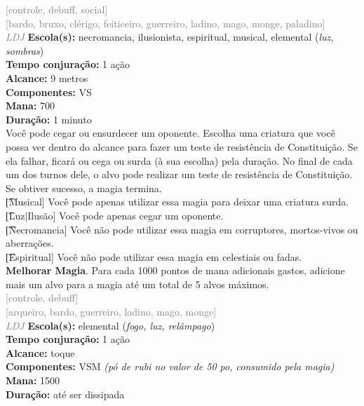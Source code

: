 \documentclass{RPG_Adventure}[2021/10/20]
\begin{document}
{\scriptsize \textcolor{gray}{[controle, debuff, social]\\}}
{\scriptsize \textcolor{gray}{[bardo, bruxo, clérigo, feiticeiro, guerreiro, ladino, mago, monge, paladino]\\}}
{\tiny \textcolor{gray}{\textit{LDJ}}}
{\small \t \textbf{Escola(s):} necromancia, ilusionista, espiritual, musical, elemental (\textit{luz, sombras})\\\t \textbf{Tempo conjuração:} 1 ação\\\t \textbf{Alcance:} 9 metros\\\t \textbf{Componentes:} VS\\\t \textbf{Mana:} 700\\\t \textbf{Duração:} 1 minuto\\}
{\normalsize Você pode cegar ou ensurdecer um oponente. Escolha uma criatura que você possa ver dentro do alcance para fazer um teste de resistência de Constituição. Se ela falhar, ficará ou cega ou surda (à sua escolha) pela duração. No final de cada um dos turnos dele, o alvo pode realizar um teste de resistência de Constituição. Se obtiver sucesso, a magia termina.\\\t [Musical] Você pode apenas utilizar essa magia para deixar uma criatura surda.\\\t [Luz|Ilusão] Você pode apenas cegar um oponente.\\\t [Necromancia] Você não pode utilizar essa magia em corruptores, mortos-vivos ou aberrações.\\\t [Espiritual] Você não pode utilizar essa magia em celestiais ou fadas.\\\t \textbf{Melhorar Magia}. Para cada 1000 pontos de mana adicionais gastos, adicione mais um alvo para a magia até um total de 5 alvos máximos.\\}
{\scriptsize \textcolor{gray}{[controle, debuff]\\}}
{\scriptsize \textcolor{gray}{[arqueiro, bardo, guerreiro, ladino, mago, monge]\\}}
{\tiny \textcolor{gray}{\textit{LDJ}}}
{\small \t \textbf{Escola(s):} elemental (\textit{fogo, luz, relâmpago})\\\t \textbf{Tempo conjuração:} 1 ação\\\t \textbf{Alcance:} toque\\\t \textbf{Componentes:} VSM \textit{(pó de rubi no valor de 50 po, consumido pela magia)}\\\t \textbf{Mana:} 1500\\\t \textbf{Duração:} até ser dissipada\\}
\end{document}
